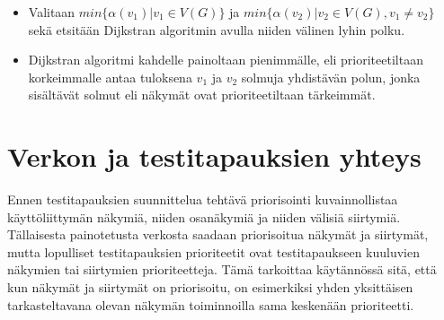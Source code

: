   \begin{itemize}
    \item Valitaan \(min\{\alpha(v_1) | v_1 \in V(G)\}\) ja \(min\{\alpha(v_2) | v_2 \in V(G), v_1 \neq v_2\}\) sekä etsitään Dijkstran algoritmin avulla niiden välinen lyhin polku.
    \item Dijkstran algoritmi kahdelle painoltaan pienimmälle, eli prioriteetiltaan korkeimmalle antaa tuloksena \(v_1\) ja \(v_2\) solmuja yhdistävän polun, jonka sisältävät solmut eli näkymät ovat prioriteetiltaan tärkeimmät.
  \end{itemize}

\section{Verkon ja testitapauksien yhteys} \label{ch:10_verkon_ja_testitapauksien_yhteys}

  Ennen testitapauksien suunnittelua tehtävä priorisointi kuvainnollistaa käyttöliittymän näkymiä, niiden osanäkymiä ja niiden välisiä siirtymiä.
  Tällaisesta painotetusta verkosta saadaan priorisoitua näkymät ja siirtymät, mutta lopulliset testitapauksien prioriteetit ovat testitapaukseen kuuluvien näkymien tai siirtymien prioriteetteja.
  Tämä tarkoittaa käytännössä sitä, että kun näkymät ja siirtymät on priorisoitu, on esimerkiksi yhden yksittäisen tarkasteltavana olevan näkymän toiminnoilla sama keskenään prioriteetti.
